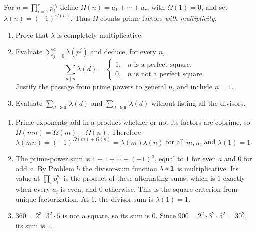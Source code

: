 \studentbreak
\instructorbreak
{}

For $n=\prod_{i=1}^r p_i^{a_i}$ define
$\Omega(n)=a_1+\cdots+a_r$, with $\Omega(1)=0$, and set
$\lambda(n)=(-1)^{\Omega(n)}$. Thus $\Omega$ counts prime factors
\emph{with multiplicity}.
\begin{enumerate}
  \item Prove that $\lambda$ is completely multiplicative.
  \item Evaluate $\sum_{j=0}^a\lambda(p^j)$ and deduce, for every $n$,
  \[
    \sum_{d\mid n}\lambda(d)=
    \begin{cases}
      1,&n\text{ is a perfect square},\\
      0,&n\text{ is not a perfect square}.
    \end{cases}
  \]
  Justify the passage from prime powers to general $n$, and include
  $n=1$. 
  \item Evaluate $\sum_{d\mid 360}\lambda(d)$ and
  $\sum_{d\mid 900}\lambda(d)$ without listing all the divisors.
\end{enumerate}
\begin{solution}
\begin{enumerate}
  \item Prime exponents add in a product whether or not its factors
  are coprime, so $\Omega(mn)=\Omega(m)+\Omega(n)$. Therefore
  $\lambda(mn)=(-1)^{\Omega(m)+\Omega(n)}=\lambda(m)\lambda(n)$
  for all $m,n$, and $\lambda(1)=1$.
  \item The prime-power sum is $1-1+\cdots+(-1)^a$, equal to
  $1$ for even $a$ and $0$ for odd $a$. By Problem 5 the divisor-sum
  function $\lambda*\mathbf{1}$ is multiplicative. Its value at
  $\prod_i p_i^{a_i}$ is the product of these alternating sums,
  which is $1$ exactly when every $a_i$ is even, and $0$ otherwise.
  This is the square criterion from unique factorization.
  At $1$, the divisor sum is $\lambda(1)=1$.
  \item $360=2^3\cdot3^2\cdot5$ is not a square, so its sum is $0$.
  Since $900=2^2\cdot3^2\cdot5^2=30^2$, its sum is $1$.
\end{enumerate}
\end{solution}

